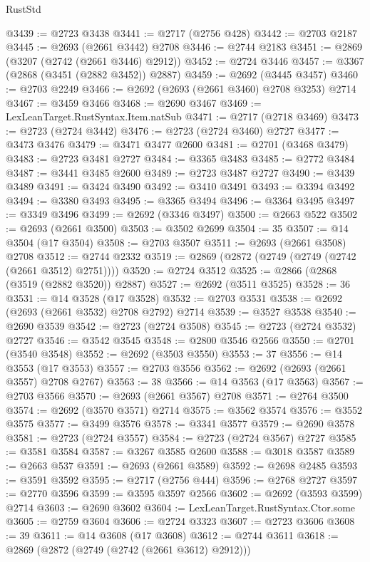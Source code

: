 \begin{lexlean}{RustStd}
\begin{coremodule}
{\begin{coremodule}
{{{{{{{{{{{{{{{{{{{{{{{{{{{{{{{{{{{{{{{@3439 := @2723 @3438
@3441 := @2717 (@2756 @428)
@3442 := @2703 @2187
@3445 := @2693 (@2661 @3442) @2708
@3446 := @2744 @2183
@3451 := @2869 (@3207 (@2742 (@2661 @3446) @2912))
@3452 := @2724 @3446
@3457 := @3367 (@2868 (@3451 (@2882 @3452)) @2887)
@3459 := @2692 (@3445 @3457)
@3460 := @2703 @2249
@3466 := @2692 (@2693 (@2661 @3460) @2708 @3253) @2714
@3467 := @3459 @3466
@3468 := @2690 @3467
@3469 := LexLeanTarget.RustSyntax.Item.natSub
@3471 := @2717 (@2718 @3469)
@3473 := @2723 (@2724 @3442)
@3476 := @2723 (@2724 @3460) @2727
@3477 := @3473 @3476
@3479 := @3471 @3477 @2600
@3481 := @2701 (@3468 @3479)
@3483 := @2723 @3481 @2727
@3484 := @3365 @3483
@3485 := @2772 @3484
@3487 := @3441 @3485 @2600
@3489 := @2723 @3487 @2727
@3490 := @3439 @3489
@3491 := @3424 @3490
@3492 := @3410 @3491
@3493 := @3394 @3492
@3494 := @3380 @3493
@3495 := @3365 @3494
@3496 := @3364 @3495
@3497 := @3349 @3496
@3499 := @2692 (@3346 @3497)
@3500 := @2663 @522
@3502 := @2693 (@2661 @3500)
@3503 := @3502 @2699
@3504 := 35
@3507 := @14 @3504 (@17 @3504)
@3508 := @2703 @3507
@3511 := @2693 (@2661 @3508) @2708
@3512 := @2744 @2332
@3519 := @2869 (@2872 (@2749 (@2749 (@2742 (@2661 @3512) @2751))))
@3520 := @2724 @3512
@3525 := @2866 (@2868 (@3519 (@2882 @3520)) @2887)
@3527 := @2692 (@3511 @3525)
@3528 := 36
@3531 := @14 @3528 (@17 @3528)
@3532 := @2703 @3531
@3538 := @2692 (@2693 (@2661 @3532) @2708 @2792) @2714
@3539 := @3527 @3538
@3540 := @2690 @3539
@3542 := @2723 (@2724 @3508)
@3545 := @2723 (@2724 @3532) @2727
@3546 := @3542 @3545
@3548 := @2800 @3546 @2566
@3550 := @2701 (@3540 @3548)
@3552 := @2692 (@3503 @3550)
@3553 := 37
@3556 := @14 @3553 (@17 @3553)
@3557 := @2703 @3556
@3562 := @2692 (@2693 (@2661 @3557) @2708 @2767)
@3563 := 38
@3566 := @14 @3563 (@17 @3563)
@3567 := @2703 @3566
@3570 := @2693 (@2661 @3567) @2708
@3571 := @2764 @3500
@3574 := @2692 (@3570 @3571) @2714
@3575 := @3562 @3574
@3576 := @3552 @3575
@3577 := @3499 @3576
@3578 := @3341 @3577
@3579 := @2690 @3578
@3581 := @2723 (@2724 @3557)
@3584 := @2723 (@2724 @3567) @2727
@3585 := @3581 @3584
@3587 := @3267 @3585 @2600
@3588 := @3018 @3587
@3589 := @2663 @537
@3591 := @2693 (@2661 @3589)
@3592 := @2698 @2485
@3593 := @3591 @3592
@3595 := @2717 (@2756 @444)
@3596 := @2768 @2727
@3597 := @2770 @3596
@3599 := @3595 @3597 @2566
@3602 := @2692 (@3593 @3599) @2714
@3603 := @2690 @3602
@3604 := LexLeanTarget.RustSyntax.Ctor.some
@3605 := @2759 @3604
@3606 := @2724 @3323
@3607 := @2723 @3606
@3608 := 39
@3611 := @14 @3608 (@17 @3608)
@3612 := @2744 @3611
@3618 := @2869 (@2872 (@2749 (@2742 (@2661 @3612) @2912)))
}}}}}}}}}}}}}}}}}}}}}}}}}}}}}}}}}}}}}}}
\end{coremodule}}
\end{coremodule}
\end{lexlean}
